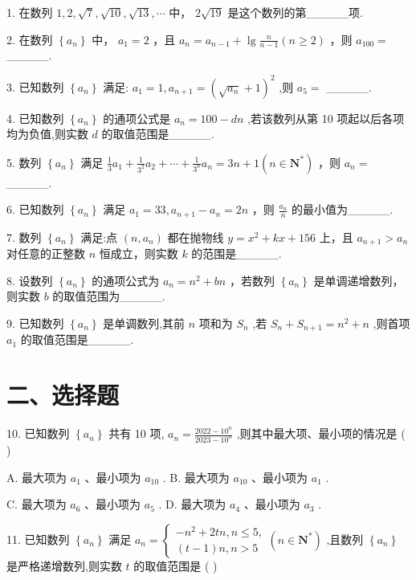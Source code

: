 1. 在数列 $1,2,\sqrt{7},\sqrt{10},\sqrt{13},\cdots$ 中， $2\sqrt{19}$ 是这个数列的第\_\_\_\_\_项.

2. 在数列 $\left\{  {a}_{n}\right\}$ 中， ${a}_{1} = 2$ ，且 ${a}_{n} = {a}_{n - 1} + \lg \frac{n}{n - 1}\left( {n \geq  2}\right)$ ，则 ${a}_{100} =$ \_\_\_\_\_.

3. 已知数列 $\left\{  {a}_{n}\right\}$ 满足: ${a}_{1} = 1,{a}_{n + 1} = {\left( \sqrt{{a}_{n}} + 1\right) }^{2}$ ,则 ${a}_{5} =$ \_\_\_\_\_.

4. 已知数列 $\left\{  {a}_{n}\right\}$ 的通项公式是 ${a}_{n} = {100} - {dn}$ ,若该数列从第 10 项起以后各项均为负值,则实数 $d$ 的取值范围是\_\_\_\_\_.

5. 数列 $\left\{  {a}_{n}\right\}$ 满足 $\frac{1}{3}{a}_{1} + \frac{1}{{3}^{2}}{a}_{2} + \cdots  + \frac{1}{{3}^{n}}{a}_{n} = {3n} + 1\left( {n \in  {\mathbf{N}}^{ * }}\right)$ ，则 ${a}_{n} =$ \_\_\_\_\_.

6. 已知数列 $\left\{  {a}_{n}\right\}$ 满足 ${a}_{1} = {33},{a}_{n + 1} - {a}_{n} = {2n}$ ，则 $\frac{{a}_{n}}{n}$ 的最小值为\_\_\_\_\_.

7. 数列 $\left\{  {a}_{n}\right\}$ 满足:点 $\left( {n,{a}_{n}}\right)$ 都在抛物线 $y = {x}^{2} + {kx} + {156}$ 上，且 ${a}_{n + 1} > {a}_{n}$ 对任意的正整数 $n$ 恒成立，则实数 $k$ 的范围是\_\_\_\_\_.

8. 设数列 $\left\{  {a}_{n}\right\}$ 的通项公式为 ${a}_{n} = {n}^{2} + {bn}$ ，若数列 $\left\{  {a}_{n}\right\}$ 是单调递增数列，则实数 $b$ 的取值范围为\_\_\_\_\_.

9. 已知数列 $\left\{  {a}_{n}\right\}$ 是单调数列,其前 $n$ 项和为 ${S}_{n}$ ,若 ${S}_{n} + {S}_{n + 1} = {n}^{2} + n$ ,则首项 ${a}_{1}$ 的取值范围是\_\_\_\_\_.

\section*{二、选择题}

10. 已知数列 $\left\{  {a}_{n}\right\}$ 共有 10 项, ${a}_{n} = \frac{{2022} - {10}^{n}}{{2023} - {10}^{n}}$ ,则其中最大项、最小项的情况是 ( )

A. 最大项为 ${a}_{1}$ 、最小项为 ${a}_{10}$ . B. 最大项为 ${a}_{10}$ 、最小项为 ${a}_{1}$ .

C. 最大项为 ${a}_{6}$ 、最小项为 ${a}_{5}$ . D. 最大项为 ${a}_{4}$ 、最小项为 ${a}_{3}$ .

11. 已知数列 $\left\{  {a}_{n}\right\}$ 满足 ${a}_{n} = \left\{  {\begin{array}{l}  - {n}^{2} + {2tn},n \leq  5, \\  \left( {t - 1}\right) n,n > 5 \end{array}\left( {n \in  {\mathbf{N}}^{ * }}\right) }\right.$ ,且数列 $\left\{  {a}_{n}\right\}$ 是严格递增数列,则实数 $t$ 的取值范围是 ( )

